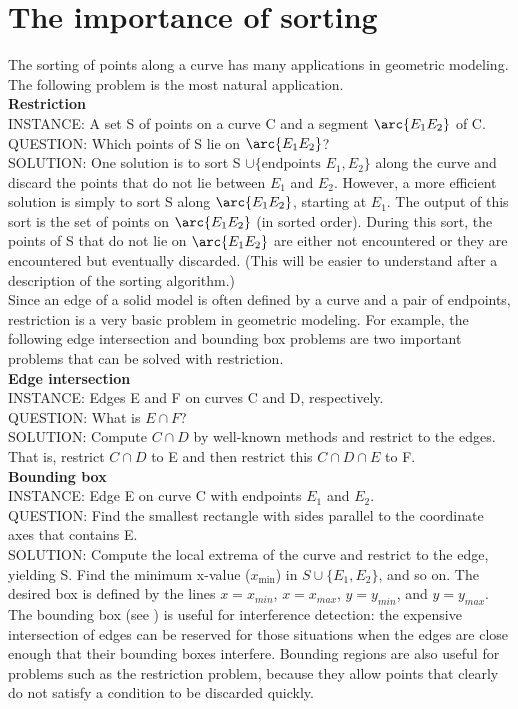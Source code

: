 \section{The importance of sorting}
The sorting of points along a curve has many applications 
in geometric modeling. 
The following problem is the most natural application.\\[.25in]
%
{\bf Restriction}\\
INSTANCE: A set S of points on a curve C and a segment $\arc{E_{1}E_{2}}$ of C.\\
QUESTION: Which points of S lie on $\arc{E_{1}E_{2}}$? \\
SOLUTION: One solution is to sort S $\cup \{\mbox{endpoints } E_{1},E_{2}\}$ along the curve
	and discard the points that do not lie between $E_{1}$ and $E_{2}$.
	However, a more efficient solution is simply to sort S along $\arc{E_{1}E_{2}}$, 
	starting at $E_{1}$.  
	The output of this sort is the set of points on $\arc{E_{1}E_{2}}$ (in sorted order).
	During this sort, the points of S that do not lie on $\arc{E_{1}E_{2}}$ are either 
	not encountered or they are encountered but eventually discarded. 
	(This will be easier to understand after a description of the sorting algorithm.)
\\[.25in]
%
Since an edge of a solid model is often defined by a curve and a pair of endpoints,
restriction is a very basic problem in geometric modeling.
For example, the following edge intersection and bounding box problems are two important 
problems that can be solved with restriction.\\[.25in]
%
{\bf Edge intersection}\\
INSTANCE: Edges E and F on curves C and D, respectively.\\
QUESTION: What is $E \cap F$?\\
SOLUTION: Compute $C \cap D$ by well-known methods and restrict to the edges.
	That is, restrict $C \cap D$ to E and then restrict this $C \cap D \cap E$ 
	to F.\\[.25in]
%
{\bf Bounding box}\\
INSTANCE: Edge E on curve C with endpoints $E_{1}$ and $E_{2}$.\\
QUESTION: Find the smallest rectangle with sides parallel to the coordinate axes that
contains E.\\
SOLUTION: Compute the local extrema of the curve and restrict to the edge, yielding S.
Find the minimum x-value ($x_{\mbox{min}}$) in $S \cup \{E_{1},E_{2}\}$, and so on.
The desired box is defined by the lines $x = x_{min}$, $x = x_{max}$, $y = y_{min}$, 
and $y = y_{max}$.\\[.25in]
%
The bounding box (see \cite[p. 372]{NS}) is useful for interference detection: 
the expensive intersection of edges can be reserved for those situations when the edges
are close enough that their bounding boxes interfere.
Bounding regions are also useful for problems such as the restriction problem, 
because they allow points that clearly do not satisfy a condition to be discarded
quickly.

